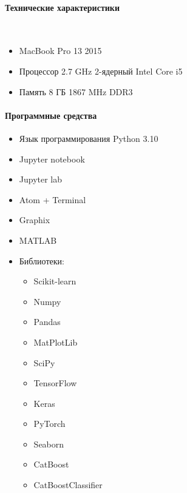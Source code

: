        \newpage
        \paragraph{Технические характеристики} 
\\
         \begin{itemize}
             \item MacBook Pro 13 2015
             \item Процессор 2.7 GHz 2-ядерный Intel Core i5
             \item Память 8 ГБ 1867 MHz DDR3 \\
         \end{itemize}
        \paragraph{Программные средства}
        \begin{itemize}
             \item Язык программирования Python 3.10
             \item Jupyter notebook
             \item Jupyter lab
             \item Atom + Terminal
             \item Graphix
             \item MATLAB 
             \item Библиотеки:
             \begin{itemize}
                 \item Scikit-learn
                 \item Numpy
                 \item Pandas
                 \item MatPlotLib
                 \item SciPy
                 \item TensorFlow
                 \item Keras
                 \item PyTorch
                 \item Seaborn
                 \item CatBoost
                 \item CatBoostClassifier \\
             \end{itemize}
         \end{itemize}
        
